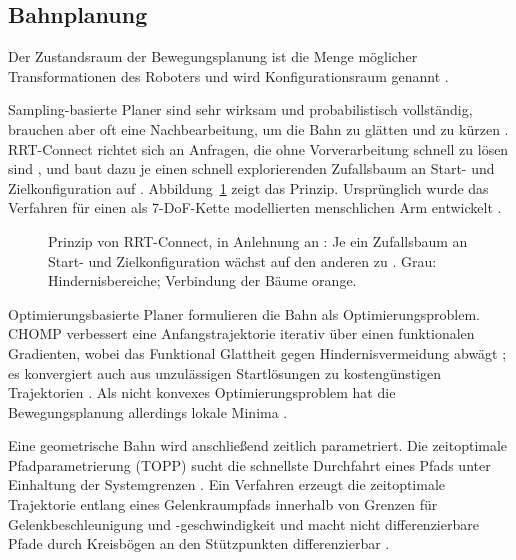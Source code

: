 \subsection{Bahnplanung}
\label{sec:bahnplanung_sdt}
Der Zustandsraum der Bewegungsplanung ist die Menge möglicher Transformationen des Roboters und wird Konfigurationsraum genannt \cite{LaValle2006}.

Sampling-basierte Planer sind sehr wirksam und probabilistisch vollständig, brauchen aber oft eine Nachbearbeitung, um die Bahn zu glätten und zu kürzen \cite{Schulman2014}.
RRT-Connect richtet sich an Anfragen, die ohne Vorverarbeitung schnell zu lösen sind \cite{Kuffner2000}, und baut dazu je einen schnell explorierenden Zufallsbaum an Start- und Zielkonfiguration auf \cite{Kuffner2000}.
Abbildung~\ref{fig:rrtconnect} zeigt das Prinzip.
Ursprünglich wurde das Verfahren für einen als 7-DoF-Kette modellierten menschlichen Arm entwickelt \cite{Kuffner2000}.

\begin{figure}[htbp]
  \centering
  
  \caption[Prinzip von RRT-Connect]{Prinzip von RRT-Connect, in Anlehnung an \cite{Kuffner2000}\ev{*}: Je ein Zufallsbaum an Start- und Zielkonfiguration \cite{Kuffner2000} wächst auf den anderen zu \cite{Kuffner2000}. Grau: Hindernisbereiche; Verbindung der Bäume orange.}
  \label{fig:rrtconnect}
\end{figure}

Optimierungsbasierte Planer formulieren die Bahn als Optimierungsproblem.
CHOMP verbessert eine Anfangstrajektorie iterativ über einen funktionalen Gradienten, wobei das Funktional Glattheit gegen Hindernisvermeidung abwägt \cite{Zucker2013}; es konvergiert auch aus unzulässigen Startlösungen zu kostengünstigen Trajektorien \cite{Zucker2013}.
Als nicht konvexes Optimierungsproblem hat die Bewegungsplanung allerdings lokale Minima \cite{Zucker2013}.

Eine geometrische Bahn wird anschließend zeitlich parametriert.
Die zeitoptimale Pfadparametrierung (TOPP) sucht die schnellste Durchfahrt eines Pfads unter Einhaltung der Systemgrenzen \cite{Pham2018}.
Ein Verfahren erzeugt die zeitoptimale Trajektorie entlang eines Gelenkraumpfads innerhalb von Grenzen für Gelenkbeschleunigung und -geschwindigkeit \cite{Kunz2012} und macht nicht differenzierbare Pfade durch Kreisbögen an den Stützpunkten differenzierbar \cite{Kunz2012}.

